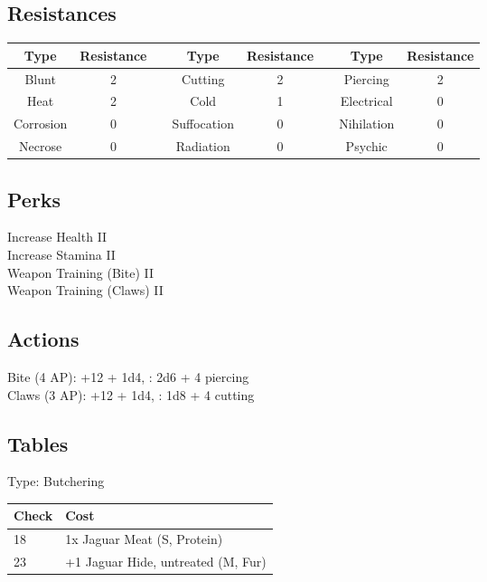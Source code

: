 \subsection{Resistances}
\begin{minipage}[H]{1\textwidth}
    \centering
    \begin{tabular}[c]{|c | c | c | c | c | c | c | c|}
        \hline
        Type & Resistance && Type & Resistance && Type & Resistance\\
        \hline
        Blunt & 2 &&
        Cutting & 2 &&
        Piercing & 2\\
        Heat & 2 &&
        Cold & 1 &&
        Electrical & 0\\
        Corrosion & 0 &&
        Suffocation & 0 &&
        Nihilation & 0 \\
        Necrose & 0 &&
        Radiation & 0 &&
        Psychic & 0\\
        \hline
    \end{tabular}
\end{minipage}

\subsection{Perks}
Increase Health II\\
Increase Stamina II\\
Weapon Training (Bite) II\\
Weapon Training (Claws) II\\

\subsection{Actions}
Bite (4 AP): +12 + 1d4, : 2d6 + 4 piercing\\

Claws (3 AP): +12 + 1d4, : 1d8 + 4 cutting\\

\subsection{Tables}
Type: Butchering
\\
\begin{minipage}{0.8\textwidth}
    \begin{tabular}{|l | l|}
        \hline
        Check & Cost\\
        \hline
        18 & 1x Jaguar Meat (S, Protein)\\
        23 & +1 Jaguar Hide, untreated (M, Fur)\\
        \hline
    \end{tabular}
\end{minipage}
\pagebreak